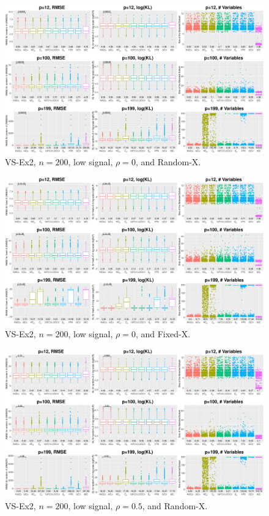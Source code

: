 \clearpage
\begin{figure}[!ht]
\centering
\includegraphics[width=\textwidth]{figures/supplement/randomx_VS-Ex2_n200_lsnr_rho0.eps}
\caption{VS-Ex2, $n=200$, low signal, $\rho=0$, and Random-X.}
\end{figure}
\begin{figure}[!ht]
\centering
\includegraphics[width=\textwidth]{figures/supplement/fixedx_VS-Ex2_n200_lsnr_rho0.eps}
\caption{VS-Ex2, $n=200$, low signal, $\rho=0$, and Fixed-X.}
\end{figure}
\clearpage
\begin{figure}[!ht]
\centering
\includegraphics[width=\textwidth]{figures/supplement/randomx_VS-Ex2_n200_lsnr_rho05.eps}
\caption{VS-Ex2, $n=200$, low signal, $\rho=0.5$, and Random-X.}
\end{figure}
